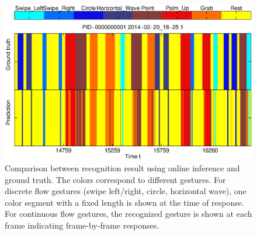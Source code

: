 \documentclass[conference]{IEEEtran}
\begin{document}
\begin{figure}[t]
\centering
\includegraphics[trim=10mm 10mm 10mm 0, clip,
width=\columnwidth]{fig/recog_result_m3.eps}
\caption{Comparison between recognition result using online inference
and ground truth.
The colors correspond to different gestures. For discrete flow gestures
(swipe left/right, circle, horizontal wave), one color segment with a fixed
length is shown at the time of response. For continuous flow gestures, the
recognized gesture is shown at each frame indicating frame-by-frame responses.}
\label{fig:recog-result}
\end{figure}
\end{document}
